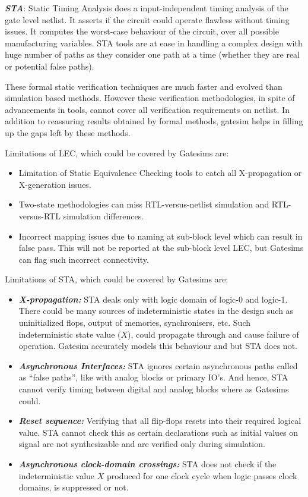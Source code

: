 \emph {\bf STA}: Static Timing Analysis does a input-independent timing analysis of the gate level netlist. It asserts if the circuit could operate flawless without timing issues. It computes the worst-case behaviour of the circuit, over all possible manufacturing variables. STA tools are at ease in handling a complex design with huge number of paths as they consider one path at a time (whether they are real or potential false paths). 



These formal static verification techniques are much faster and evolved than simulation based methods. However these verification methodologies, in spite of advancements in tools, cannot cover all verification requirements on netlist. In addition to reassuring results obtained by formal methods, gatesim helps in filling up the gaps left by these methods. 

Limitations of LEC, which could be covered by Gatesims are:
\begin{itemize}
	\item Limitation of Static Equivalence Checking tools to catch all X-propagation or X-generation issues.
	\item Two-state methodologies can miss RTL-versus-netlist simulation and RTL-versus-RTL simulation differences.
	\item Incorrect mapping issues due to naming at sub-block level which can result in false pass. This will not be reported at the sub-block level LEC, but Gatesims can flag such incorrect connectivity.
\end{itemize}

Limitations of STA, which could be covered by Gatesims are:
\begin{itemize}
	\item \emph{\bf X-propagation:} STA deals only with logic domain of logic-0 and logic-1. There could be many sources of indeterministic states in the design such as uninitialized flops, output of memories, synchronisers, etc. Such indeterministic state value ($X$), could propagate through and cause failure of operation. Gatesim accurately models this behaviour and but STA does not.
	\item \emph{\bf Asynchronous Interfaces:} STA ignores certain asynchronous paths called as ``false paths'', like with analog blocks or primary IO's. And hence, STA cannot verify timing between digital and analog blocks where as Gatesims could.
	\item \emph{\bf Reset sequence:} Verifying that all flip-flops resets into their required logical value. STA cannot check this as certain declarations such as initial values on signal are not synthesizable and are verified only during simulation.
	\item \emph{\bf Asynchronous clock-domain crossings:} STA does not check if the indeterministic value $X$ produced for one clock cycle when logic passes clock domains, is suppressed or not.
\end{itemize}








